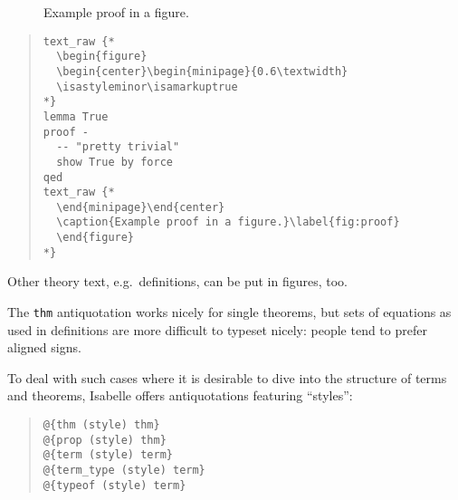 \begin{isabellebody}
\begin{figure}
\begin{center}
\begin{minipage}{0.6\textwidth}
%
\endisadelimproof
%
\end{minipage}\end{center}
  \caption{Example proof in a figure.}\label{fig:proof}
  \end{figure}
%
\begin{isamarkuptext}%
\begin{quote}
\small
\verb!text_raw {!\verb!*!\\
\verb!  \begin{figure}!\\
\verb!  \begin{center}\begin{minipage}{0.6\textwidth}!\\
\verb!  \isastyleminor\isamarkuptrue!\\
\verb!*!\verb!}!\\
\verb!lemma True!\\
\verb!proof -!\\
\verb!  -- "pretty trivial"!\\
\verb!  show True by force!\\
\verb!qed!\\
\verb!text_raw {!\verb!*!\\
\verb!  \end{minipage}\end{center}!\\
\verb!  \caption{Example proof in a figure.}\label{fig:proof}!\\
\verb!  \end{figure}!\\
\verb!*!\verb!}!
\end{quote}

Other theory text, e.g.\ definitions, can be put in figures, too.%
\end{isamarkuptext}%
\isamarkuptrue%
%
\isamarkuptrue%
%
\begin{isamarkuptext}%
The \verb!thm! antiquotation works nicely for single theorems, but
  sets of equations as used in definitions are more difficult to
  typeset nicely: people tend to prefer aligned  signs.

  To deal with such cases where it is desirable to dive into the structure
  of terms and theorems, Isabelle offers antiquotations featuring
  ``styles'':

    \begin{quote}
    \verb!@!\verb!{thm (style) thm}!\\
    \verb!@!\verb!{prop (style) thm}!\\
    \verb!@!\verb!{term (style) term}!\\
    \verb!@!\verb!{term_type (style) term}!\\
    \verb!@!\verb!{typeof (style) term}!\\
    \end{quote}


\end{isamarkuptext}
\end{isabellebody}
